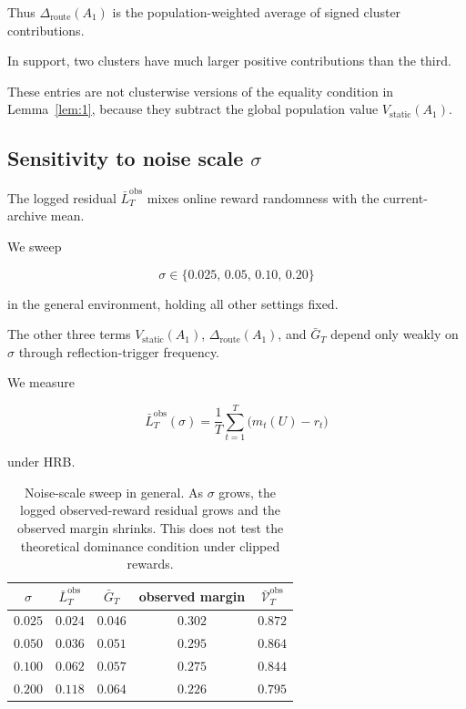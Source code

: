 \documentclass{article} %
\begin{document}
Thus \(\Delta_{\mathrm{route}}(A_1)\) is the population-weighted average of
signed cluster contributions.

In support, two clusters have much larger positive contributions than the
third.

These entries are not clusterwise versions of the equality condition in
Lemma~\ref{lem:1}, because they subtract the global population value
\(V_{\mathrm{static}}(A_1)\).

\subsection{Sensitivity to noise scale $\sigma$}

\label{app:sigma-sweep}

The logged residual \(\bar L_T^{\mathrm{obs}}\) mixes online reward randomness
with the current-archive mean.

We sweep

\begin{equation}
\label{eq:app-sigma-grid}
\sigma \in \{0.025,\, 0.05,\, 0.10,\, 0.20\}
\end{equation}

in the general environment, holding all other settings fixed.

The other three terms $V_{\mathrm{static}}(A_1)$, $\Delta_{\mathrm{route}}(A_1)$, and $\bar{G}_T$ depend only weakly on $\sigma$ through reflection-trigger frequency.

We measure

\begin{equation}
\label{eq:app-LT-of-sigma}
\bar L_T^{\mathrm{obs}}(\sigma)
=
\frac{1}{T}\sum_{t=1}^{T}\bigl(m_t(U)-r_t\bigr)
\end{equation}

under HRB.

\begin{table}[h]
\centering
\small
\begin{tabular}{ccccc}
\toprule
$\sigma$ & $\bar L_T^{\mathrm{obs}}$ & $\bar G_T$ & observed margin & $\bar{\mathcal V}_T^{\mathrm{obs}}$ \\
\midrule
$0.025$ & $0.024$ & $0.046$ & $0.302$ & $0.872$ \\
$0.050$ & $0.036$ & $0.051$ & $0.295$ & $0.864$ \\
$0.100$ & $0.062$ & $0.057$ & $0.275$ & $0.844$ \\
$0.200$ & $0.118$ & $0.064$ & $0.226$ & $0.795$ \\
\bottomrule
\end{tabular}
\caption{Noise-scale sweep in general. As \(\sigma\) grows, the logged
observed-reward residual grows and the observed margin shrinks. This does not
test the theoretical dominance condition under clipped rewards.}
\label{tab:app-sigma-sweep}
\end{table}
\end{document}

